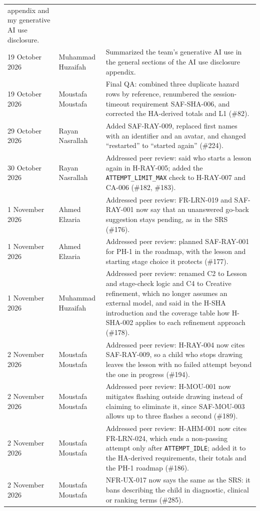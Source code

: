\documentclass{article}
\begin{document}
\begin{longtable}{@{}p{2.5cm}p{3.5cm}%
  >{\raggedright\arraybackslash}p{\dimexpr\textwidth-6cm-4\tabcolsep\relax}@{}}
appendix and my generative AI use disclosure.\\
19 October 2026 & Muhammad Huzaifah & Summarized the team's generative AI
use in the general sections of the AI use disclosure appendix.\\
19 October 2026 & Moustafa Moustafa & Final QA: combined three duplicate
hazard rows by reference, renumbered the session-timeout requirement
SAF-SHA-006, and corrected the HA-derived totals and L1 (\#82).\\
29 October 2026 & Rayan Nasrallah & Added SAF-RAY-009, replaced first names
with an identifier and an avatar, and changed ``restarted'' to ``started
again'' (\#224).\\
30 October 2026 & Rayan Nasrallah & Addressed peer review: said who starts a
lesson again in H-RAY-005; added the \texttt{ATTEMPT\_LIMIT\_MAX} check to
H-RAY-007 and CA-006 (\#182, \#183).\\
1 November 2026 & Ahmed Elzaria & Addressed peer review: FR-LRN-019 and
SAF-RAY-001 now say that an unanswered go-back suggestion stays pending, as in
the SRS (\#176).\\
1 November 2026 & Ahmed Elzaria & Addressed peer review: planned SAF-RAY-001 for
PH-1 in the roadmap, with the lesson and starting stage choice it protects
(\#177).\\
1 November 2026 & Muhammad Huzaifah & Addressed peer review: renamed C2 to
Lesson and stage-check logic and C4 to Creative refinement, which no longer
assumes an external model, and said in the H-SHA introduction and the coverage
table how H-SHA-002 applies to each refinement approach (\#178).\\
2 November 2026 & Moustafa Moustafa & Addressed peer review: H-RAY-004 now
cites SAF-RAY-009, so a child who stops drawing leaves the lesson with no
failed attempt beyond the one in progress (\#194).\\
2 November 2026 & Moustafa Moustafa & Addressed peer review: H-MOU-001 now
mitigates flashing outside drawing instead of claiming to eliminate it, since
SAF-MOU-003 allows up to three flashes a second (\#189).\\
2 November 2026 & Moustafa Moustafa & Addressed peer review: H-AHM-001 now
cites FR-LRN-024, which ends a non-passing attempt only after
\texttt{ATTEMPT\_IDLE}; added it to the HA-derived requirements, their totals
and the PH-1 roadmap (\#186).\\
2 November 2026 & Moustafa Moustafa & NFR-UX-017 now says the same as the SRS:
it bans describing the child in diagnostic, clinical or ranking terms (\#285).\\

\end{longtable}
\end{document}
